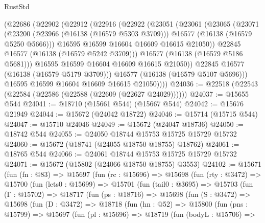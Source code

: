 \begin{lexlean}{RustStd}
\begin{coremodule}
          (@22686
            (@22902
              (@22912
                (@22916
                  (@22922
                    (@23051
                      (@23061
                        (@23065
                          (@23071
                            (@23200
                              (@23966 (@16138 (@16579 @5303 @3709)))
                              @16577
                              (@16138 (@16579 @5250 @5666)))
                            @16595
                            @16599
                            @16604
                            @16609
                            @16615
                            @21050))
                        @22845
                        @16577
                        (@16138 (@16579 @5242 @3709)))
                      @16577
                      (@16138 (@16579 @5186 @5681)))
                    @16595
                    @16599
                    @16604
                    @16609
                    @16615
                    @21050))
                @22845
                @16577
                (@16138 (@16579 @5179 @3709)))
              @16577
              (@16138 (@16579 @5107 @5696)))
            @16595
            @16599
            @16604
            @16609
            @16615
            @21050))))
@24036 := @22518 (@22543 (@22584 (@22586 (@22588 (@22609 (@22627 @24029))))))
@24037 := @15655 @544
@24041 := @18710 (@15661 @544) (@15667 @544)
@24042 := @15676 @21949
@24044 := @15672 (@24042 @18722)
@24046 := @15714 (@15715 @544)
@24047 := @15710 @24046
@24049 := @15672 (@24047 @18736)
@24050 := @18742 @544
@24055 := @24050 @18744 @15753 @15725 @15729 @15732
@24060 := @15672 (@18741 (@24055 @18750 @18755) @18762)
@24061 := @18765 @544
@24066 := @24061 @18744 @15753 @15725 @15729 @15732
@24071 := @15672 (@15802 (@24066 @18750 @18755) @3553)
@24102 := @15671
    (fun (fn : @83) =>
    @15697
      (fun (rc : @15696) =>
      @15698
        (fun (rty : @3472) =>
        @15700
          (fun (lets0 : @15699) =>
          @15701
            (fun (tail0 : @3695) =>
            @15703
              (fun (Γ : @15702) =>
              @18717
                (fun (ps : @18716) =>
                @15698
                  (fun (S : @3472) =>
                  @15698
                    (fun (D : @3472) =>
                    @18718
                      (fun (hn : @52) =>
                      @15800
                        (fun (pns : @15799) =>
                        @15697
                          (fun (pl : @15696) =>
                          @18719
                            (fun (bodyL : @15706) =>

\end{coremodule}
\end{lexlean}
